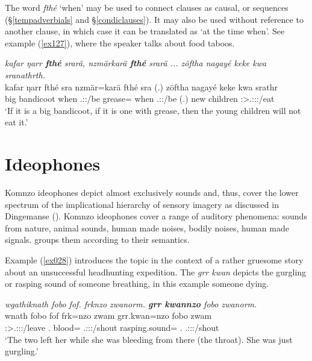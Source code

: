 The word \emph{fthé} `when' may be used to connect clauses as causal,  or  sequences (\S\ref{tempadverbials} and \S\ref{condiclauses}). It may also be used without reference to another clause, in which case it can be translated as `at the time when'. See example (\ref{ex127}), where the speaker talks about food taboos.

\begin{exe}
	\ex \emph{kafar ŋarr \textbf{fthé} srarä, nzmärkarä \textbf{fthé} srarä ... zöftha nagayé keke kwa sranathrth.}\\
	\gll kafar ŋarr fthé sra nzmär=karä fthé sra (.) zöftha nagayé keke kwa srathr\\
	big bandicoot when \Tsg.\Masc:\Irr:\Ipfv/be grease={\Prop} when \Tsg.\Masc:\Irr:\Ipfv/be (.) new children {\Neg} {\Fut} \Stsg:\Sbj>\Tsg.\Masc:\Obj:\Irr:\Ipfv/eat\\
	\trans `If it is a big bandicoot, if it is one with grease, then the young children will not eat it.' 
	\label{ex127}
\end{exe}

\section{Ideophones} \label{ideophones-sec}

Komnzo ideophones depict almost exclusively sounds and, thus, cover the lower spectrum of the implicational hierarchy of sensory imagery as discussed in Dingemanse (\citeyear[663]{Dingemanse:2012fc}). Komnzo ideophones cover a range of auditory phenomena: sounds from nature, animal sounds, human made noises, bodily noises, human made signals.  groups them according to their semantics.

Example (\ref{ex028}) introduces the topic in the context of a rather gruesome story about an unsuccessful headhunting expedition. The  \emph{grr kwan} depicts the gurgling or rasping sound of someone breathing, in this example someone dying.

\begin{exe}
	\ex \emph{wgathiknath fobo fof. frknzo zwanorm. \textbf{grr kwannzo} fobo zwanorm.}\\
	\gll wnath fobo fof frk=nzo zwam grr.kwan=nzo fobo zwam\\
	\Stdu:\Sbj>\Tsg.\F:\Obj:\Pst:\Ipfv/leave {\Dist}.{\All} {\Emph} blood={\Only} \Tsg.\F:\Sbj:\Pst:\Dur/shout rasping.sound={\Only} {\Dist}.{\All} \Tsg.\F:\Sbj:\Pst:\Dur/shout\\
	\trans `The two left her while she was bleeding from there (the throat). She was just gurgling.' 
	\label{ex028}
\end{exe}

